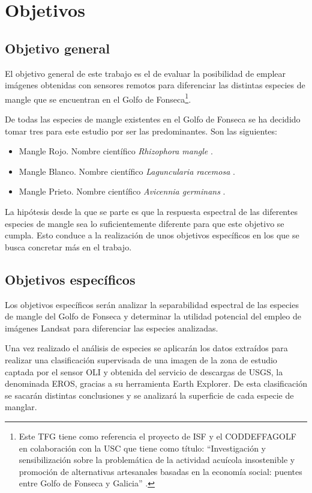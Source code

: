 \section{Objetivos}
\subsection{Objetivo general}
El objetivo general de este trabajo es el de evaluar la posibilidad de emplear imágenes obtenidas con sensores remotos para diferenciar las distintas especies de mangle que se encuentran en el Golfo de Fonseca\footnote{Este \ac{TFG} tiene como referencia el proyecto de \ac{ISF} y el \ac{CODDEFFAGOLF} en colaboración con la \ac{USC} que tiene como título: ``Investigación y sensibilización sobre la problemática de la actividad acuícola insostenible y promoción de alternativas artesanales basadas en la economía social: puentes entre Golfo de Fonseca y Galicia'' \citep{laborate2014}.}.%

De todas las especies de mangle existentes en el Golfo de Fonseca se ha decidido tomar tres para este estudio por ser las predominantes. Son las siguientes:

\begin{itemize}
	\item Mangle Rojo. Nombre científico \textit{Rhizophora mangle} \citep{JimenezRhizophora}.
	\item Mangle Blanco. Nombre científico \textit{Laguncularia racemosa} \citep{JimenezLaguncularia}.
	\item Mangle Prieto. Nombre científico \textit{Avicennia germinans} \citep{JimenezAvicennia}.
\end{itemize}

La hipótesis desde la que se parte es que la respuesta espectral de las diferentes especies de mangle sea lo suficientemente diferente para que este objetivo se cumpla. Esto conduce a la realización de unos objetivos específicos en los que se busca concretar más en el trabajo.

\subsection{Objetivos específicos}
Los objetivos específicos serán analizar la separabilidad espectral de las especies de mangle del Golfo de Fonseca y determinar la utilidad potencial del empleo de imágenes Landsat para diferenciar las especies analizadas.%

Una vez realizado el análisis de especies se aplicarán los datos extraídos para realizar una clasificación supervisada de una imagen de la zona de estudio captada por el sensor \ac{OLI} y obtenida del servicio de descargas de \ac{USGS}, la denominada \ac{EROS}, gracias a su herramienta Earth Explorer. De esta clasificación se sacarán distintas conclusiones y se analizará la superficie de cada especie de manglar.%

